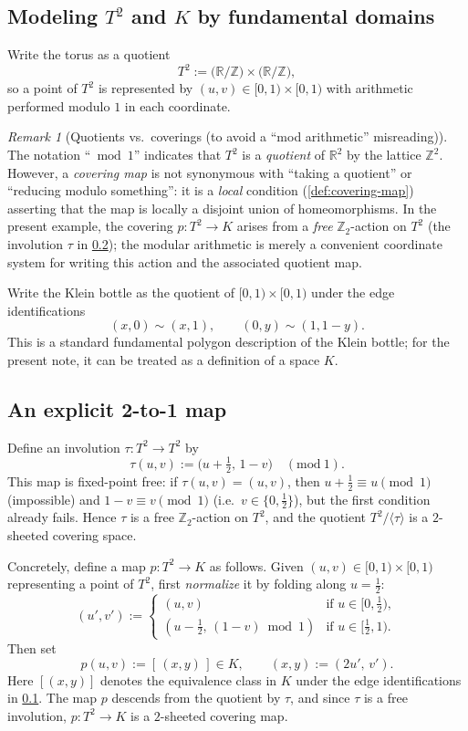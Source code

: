 \documentclass[11pt,a4paper]{article}
\theoremstyle{definition}
\theoremstyle{remark}
\newtheorem{remark}[theorem]{Remark}
\begin{document}
\subsection{Modeling \(T^2\) and \(K\) by fundamental domains}
\label{sec:domains}

Write the torus as a quotient
\[
T^2 := \bigl(\mathbb{R}/\mathbb{Z}\bigr)\times\bigl(\mathbb{R}/\mathbb{Z}\bigr),
\]
so a point of \(T^2\) is represented by \((u,v)\in [0,1)\times[0,1)\) with arithmetic performed modulo \(1\) in each coordinate.

\begin{remark}[Quotients vs.\ coverings (to avoid a ``mod arithmetic'' misreading)]
\label{rem:quotient-vs-covering}
The notation ``\(\bmod 1\)'' indicates that \(T^2\) is a \emph{quotient} of \(\mathbb{R}^2\) by the lattice \(\mathbb{Z}^2\). However, a \emph{covering map} is not synonymous with ``taking a quotient'' or ``reducing modulo something'': it is a \emph{local} condition (\cref{def:covering-map}) asserting that the map is locally a disjoint union of homeomorphisms. In the present example, the covering \(p:T^2\to K\) arises from a \emph{free} \(\mathbb{Z}_2\)-action on \(T^2\) (the involution \(\tau\) in \cref{sec:explicit-map}); the modular arithmetic is merely a convenient coordinate system for writing this action and the associated quotient map.
\end{remark}

Write the Klein bottle as the quotient of \([0,1)\times[0,1)\) under the edge identifications
\[
(x,0)\sim(x,1),\qquad (0,y)\sim(1,1-y).
\]
This is a standard fundamental polygon description of the Klein bottle; for the present note, it can be treated as a definition of a space \(K\).

\subsection{An explicit 2-to-1 map}
\label{sec:explicit-map}

Define an involution \(\tau:T^2\to T^2\) by
\[
\tau(u,v) := \bigl(u+\tfrac12,\, 1-v\bigr) \quad (\mathrm{mod}\ 1).
\]
This map is fixed-point free: if \(\tau(u,v)=(u,v)\), then \(u+\tfrac12\equiv u\pmod 1\) (impossible) and \(1-v\equiv v\pmod 1\) (i.e.\ \(v\in\{0,\tfrac12\}\)), but the first condition already fails. Hence \(\tau\) is a free \(\mathbb{Z}_2\)-action on \(T^2\), and the quotient \(T^2/\langle\tau\rangle\) is a \(2\)-sheeted covering space.

Concretely, define a map \(p:T^2\to K\) as follows. Given \((u,v)\in[0,1)\times[0,1)\) representing a point of \(T^2\), first \emph{normalize} it by folding along \(u=\tfrac12\):
\[
(u',v') :=
\begin{cases}
(u,v) & \text{if } u\in[0,\tfrac12),\\
(u-\tfrac12,\, (1-v)\bmod 1) & \text{if } u\in[\tfrac12,1).
\end{cases}
\]
Then set
\[
p(u,v) := [\, (x,y) \,] \in K,\qquad (x,y):=(2u',\, v').
\]
Here \([ (x,y) ]\) denotes the equivalence class in \(K\) under the edge identifications in \cref{sec:domains}. The map \(p\) descends from the quotient by \(\tau\), and since \(\tau\) is a free involution, \(p:T^2\to K\) is a \(2\)-sheeted covering map.
\end{document}
